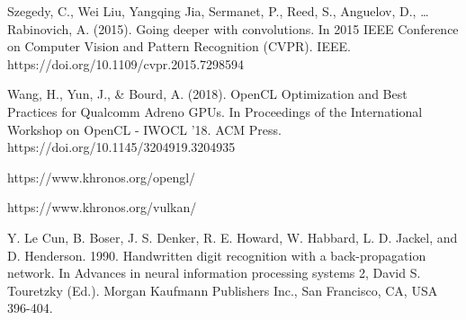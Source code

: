 \begin{thebibliography}{4}
{Szegedy, C., Wei Liu, Yangqing Jia, Sermanet, P., Reed, S., Anguelov, D., … Rabinovich, A. (2015). Going deeper with convolutions. In 2015 IEEE Conference on Computer Vision and Pattern Recognition (CVPR). IEEE. https://doi.org/10.1109/cvpr.2015.7298594}

{Wang, H., Yun, J., \& Bourd, A. (2018). OpenCL Optimization and Best Practices for Qualcomm Adreno GPUs. In Proceedings of the International Workshop on OpenCL - IWOCL ’18. ACM Press. https://doi.org/10.1145/3204919.3204935}

{https://www.khronos.org/opengl/}

{https://www.khronos.org/vulkan/}

{Y. Le Cun, B. Boser, J. S. Denker, R. E. Howard, W. Habbard, L. D. Jackel, and D. Henderson. 1990. Handwritten digit recognition with a back-propagation network. In Advances in neural information processing systems 2, David S. Touretzky (Ed.). Morgan Kaufmann Publishers Inc., San Francisco, CA, USA 396-404.}

\end{thebibliography}

